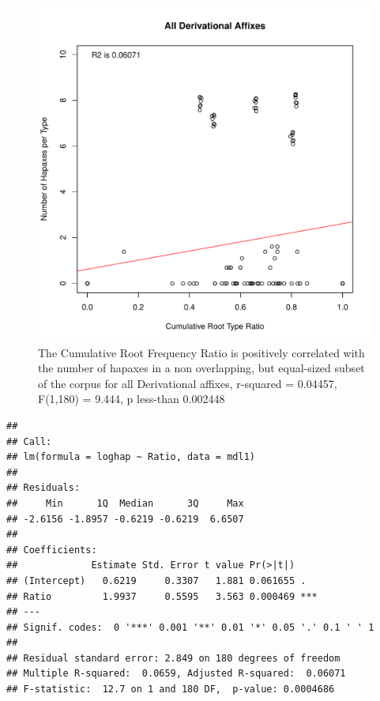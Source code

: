\documentclass[12pt]{article}\usepackage[]{graphicx}\usepackage[]{color}
\makeatletter
\def\maxwidth{ %
  \ifdim\Gin@nat@width>\linewidth
    \linewidth
  \else
    \Gin@nat@width
  \fi
}
\newenvironment{kframe}{%
 \def\at@end@of@kframe{}%
 \ifinner\ifhmode%
  \def\at@end@of@kframe{\end{minipage}}%
  \begin{minipage}{\columnwidth}%
 \fi\fi%
 \def\FrameCommand##1{\hskip\@totalleftmargin \hskip-\fboxsep
 \colorbox{shadecolor}{##1}\hskip-\fboxsep
     \hskip-\linewidth \hskip-\@totalleftmargin \hskip\columnwidth}%
 \MakeFramed {\advance\hsize-\width
   \@totalleftmargin\z@ \linewidth\hsize
   \@setminipage}}%
 {\par\unskip\endMakeFramed%
 \at@end@of@kframe}
\newenvironment{knitrout}{}{} %
\makeatother
\begin{document}
\begin{knitrout}
\color{fgcolor}\begin{figure}
\includegraphics[width=\maxwidth]{figure/HapaxDataDerivation-1} \caption[The Cumulative Root Frequency Ratio is positively correlated with the number of hapaxes in a non overlapping, but equal-sized subset of the corpus for all Derivational affixes, r-squared = 0.04457, F(1,180) = 9.444, p less-than 0.002448]{The Cumulative Root Frequency Ratio is positively correlated with the number of hapaxes in a non overlapping, but equal-sized subset of the corpus for all Derivational affixes, r-squared = 0.04457, F(1,180) = 9.444, p less-than 0.002448}\label{fig:HapaxDataDerivation}
\end{figure}

\begin{kframe}\begin{verbatim}
## 
## Call:
## lm(formula = loghap ~ Ratio, data = mdl1)
## 
## Residuals:
##     Min      1Q  Median      3Q     Max 
## -2.6156 -1.8957 -0.6219 -0.6219  6.6507 
## 
## Coefficients:
##             Estimate Std. Error t value Pr(>|t|)    
## (Intercept)   0.6219     0.3307   1.881 0.061655 .  
## Ratio         1.9937     0.5595   3.563 0.000469 ***
## ---
## Signif. codes:  0 '***' 0.001 '**' 0.01 '*' 0.05 '.' 0.1 ' ' 1
## 
## Residual standard error: 2.849 on 180 degrees of freedom
## Multiple R-squared:  0.0659,	Adjusted R-squared:  0.06071 
## F-statistic:  12.7 on 1 and 180 DF,  p-value: 0.0004686
\end{verbatim}
\end{kframe}
\end{knitrout}
\end{document}
